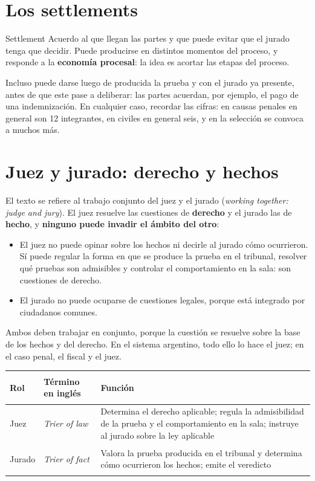 \documentclass[12pt,oneside]{book}
\begin{document}
\section{Los settlements}

\begin{definition}{Settlement}
Acuerdo al que llegan las partes y que puede evitar que el jurado tenga que decidir. Puede producirse en distintos momentos del proceso, y responde a la \textbf{economía procesal}: la idea es acortar las etapas del proceso.
\end{definition}

Incluso puede darse luego de producida la prueba y con el jurado ya presente, antes de que este pase a deliberar: las partes acuerdan, por ejemplo, el pago de una indemnización. En cualquier caso, recordar las cifras: en causas penales en general son 12 integrantes, en civiles en general seis, y en la selección se convoca a muchos más.

\section{Juez y jurado: derecho y hechos}

El texto se refiere al trabajo conjunto del juez y el jurado (\textit{working together: judge and jury}). El juez resuelve las cuestiones de \textbf{derecho} y el jurado las de \textbf{hecho}, y \textbf{ninguno puede invadir el ámbito del otro}:
\begin{itemize}
\item El juez no puede opinar sobre los hechos ni decirle al jurado cómo ocurrieron. Sí puede regular la forma en que se produce la prueba en el tribunal, resolver qué pruebas son admisibles y controlar el comportamiento en la sala: son cuestiones de derecho.
\item El jurado no puede ocuparse de cuestiones legales, porque está integrado por ciudadanos comunes.
\end{itemize}

Ambos deben trabajar en conjunto, porque la cuestión se resuelve sobre la base de los hechos y del derecho. En el sistema argentino, todo ello lo hace el juez; en el caso penal, el fiscal y el juez.

\begin{table}[H]
\centering
\small
\renewcommand{\arraystretch}{1.25}
\begin{tabularx}{\textwidth}{@{}>{\bfseries\raggedright\arraybackslash}p{}>{\raggedright\arraybackslash}p{}Y@{}}
\toprule
Rol & Término en inglés & Función \\
\midrule
Juez & \textit{Trier of law} & Determina el derecho aplicable; regula la admisibilidad de la prueba y el comportamiento en la sala; instruye al jurado sobre la ley aplicable \\
Jurado & \textit{Trier of fact} & Valora la prueba producida en el tribunal y determina cómo ocurrieron los hechos; emite el veredicto \\
\bottomrule
\end{tabularx}
\end{table}
\end{document}

